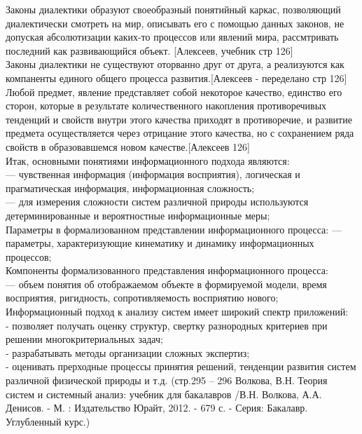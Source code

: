 \documentclass[a4paper,12pt]{report}
\begin{document}
Законы диалектики образуют своеобразный понятийный каркас, позволяющий диалектически смотреть на мир, описывать его с помощью данных законов, не допуская абсолютизации каких-то процессов или явлений мира, рассмтривать последний как развивающийся объект. [Алексеев, учебник стр 126]\\
Законы диалектики не существуют оторванно  друг от друга, а реализуются как компаненты единого общего процесса развития.[Алексеев - переделано стр 126]\\
Любой предмет, явление представляет собой некоторое качество, единство его сторон, которые в результате количественного накопления противоречивых тенденций и свойств внутри этого качества приходят в противоречие, и развитие предмета осуществляется через отрицание этого качества, но с сохранением ряда свойств в образовавшемся новом качестве.[Алексеев 126]\\

Итак, основными понятиями информационного подхода являются: \\
— чувственная информация (информация восприятия), логическая и прагматическая информация, информационная сложность;\\
— для измерения сложности систем различной природы используются детерминированные и вероятностные информационные меры;\\

Параметры в формализованном представлении информационного процесса:
— параметры, характеризующие кинематику и динамику информационных процессов;\\

Компоненты формализованного представления информационного процесса:\\
— объем понятия об отображаемом объекте в формируемой модели, время восприятия, ригидность, сопротивляемость восприятию нового;\\

Информационный подход к анализу систем имеет широкий спектр приложений:\\
- позволяет получать оценку структур, свертку разнородных критериев при решении многокритериальных задач;\\
- разрабатывать методы организации сложных экспертиз;\\
- оценивать прерходные процессы принятия решений, тенденции развития систем различной физической природы и т.д. (стр.295 – 296  Волкова, В.Н. Теория систем и системный анализ: учебник для бакалавров /В.Н. Волкова, А.А. Денисов. - М. : Издательство Юрайт, 2012. - 679 с. - Серия: Бакалавр. Углубленный курс.)\\
\end{document}
